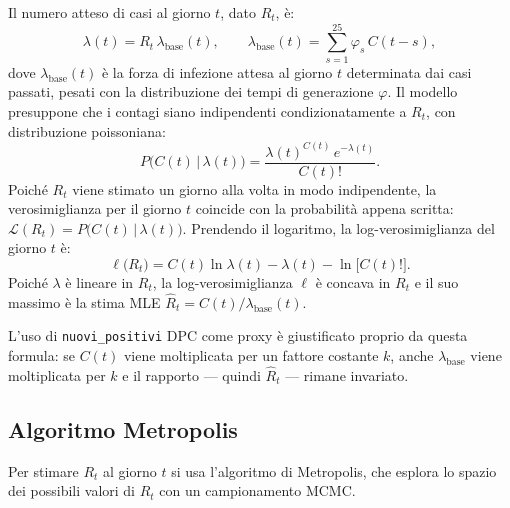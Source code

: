 \documentclass[12pt, a4paper]{article}
\begin{document}
Il numero atteso di casi al giorno $t$, dato $R_t$, è:
\begin{equation}
    \lambda(t) = R_t\,\lambda_{\text{base}}(t), \qquad
    \lambda_{\text{base}}(t) = \sum_{s=1}^{25} \varphi_s\, C(t-s),
    \label{eq:lambda}
\end{equation}
dove $\lambda_{\text{base}}(t)$ è la forza di infezione attesa al giorno $t$ determinata dai
casi passati, pesati con la distribuzione dei tempi di generazione $\varphi$.
Il modello presuppone che i contagi siano indipendenti condizionatamente a $R_t$, con distribuzione
poissoniana:
\begin{equation}
    P\bigl(C(t)\,\big|\,\lambda(t)\bigr) = \frac{\lambda(t)^{C(t)}\, e^{-\lambda(t)}}{C(t)!}.
    \label{eq:poisson}
\end{equation}
Poiché $R_t$ viene stimato un giorno alla volta in modo indipendente,
la verosimiglianza per il giorno $t$ coincide con la probabilità appena scritta:
$\mathcal{L}(R_t) = P\bigl(C(t)\,\big|\,\lambda(t)\bigr)$.
Prendendo il logaritmo, la log-verosimiglianza del giorno $t$ è:
\begin{equation}
    \ell\bigl(R_t\bigr) = C(t)\ln\lambda(t) - \lambda(t) - \ln\bigl[C(t)!\bigr].
    \label{eq:loglik}
\end{equation}
Poiché $\lambda$ è lineare in $R_t$, la log-verosimiglianza $\ell$ è concava in $R_t$ e il suo
massimo è la stima MLE $\hat{R}_t = C(t)/\lambda_{\text{base}}(t)$.

L'uso di \texttt{nuovi\_positivi} DPC come proxy è giustificato proprio da questa formula:
se $C(t)$ viene moltiplicata per un fattore costante $k$, anche $\lambda_{\text{base}}$
viene moltiplicata per $k$ e il rapporto — quindi $\hat{R}_t$ — rimane invariato.

\subsection{Algoritmo Metropolis}
\label{sub:metropolis}

Per stimare $R_t$ al giorno $t$ si usa l'algoritmo di Metropolis, che esplora lo spazio dei
possibili valori di $R_t$ con un campionamento MCMC.
\end{document}
